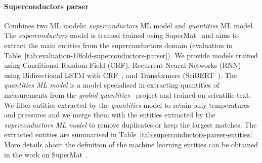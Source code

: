 \documentclass{article}
\begin{document}
\paragraph{Superconductors parser}
Combines two ML models: \textit{superconductors} ML model and \textit{quantities} ML model.
The \textit{superconductors} model is trained trained using SuperMat~\cite{foppiano2021supermat} and aims to extract the main entities from the superconductors domain (evaluation in Table~\ref{tab:evaluation-10fold-superconductors-parser}).
We provide models trained using Conditional Random Field (CRF), Recurrent Neural Networks (RNN) using Bidirectional LSTM with CRF~\cite{Lample2016NeuralAF}, and Transformers (SciBERT~\cite{Beltagy2019SciBERT}).
The \textit{quantities ML model} is a model specialised in extracting quantities of measurements from the \textit{grobid-quantities}~\cite{foppiano2019quantities} project and trained on scientific text.
We filter entities extracted by the \textit{quantities} model to retain only temperatures and pressures and we merge them with the entities extracted by the \textit{superconductors ML model} to remove duplicates or keep the largest matches.
The extracted entities are summarised in Table~\ref{tab:superconductors-parser-entities}. More details about the definition of the machine learning entities can be obtained in the work on SuperMat~\cite{foppiano2021supermat}.
\end{document}
